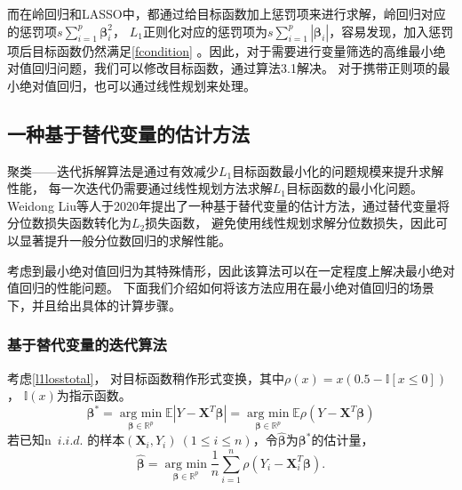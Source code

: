 而在岭回归和LASSO中，都通过给目标函数加上惩罚项来进行求解，岭回归对应的惩罚项$s\sum_{i=1}^p\bm{\beta}_i^2$，
$L_1$正则化对应的惩罚项为$s\sum_{i=1}^p|\bm{\beta}_i|$，容易发现，加入惩罚项后目标函数仍然满足\eqref{fcondition}
。因此，对于需要进行变量筛选的高维最小绝对值回归问题，我们可以修改目标函数，通过算法3.1解决。
对于携带正则项的最小绝对值回归，也可以通过线性规划来处理\cite{wang2006regularized}。

\subsection{一种基于替代变量的估计方法}
聚类——迭代拆解算法是通过有效减少$L_1$目标函数最小化的问题规模来提升求解性能，
每一次迭代仍需要通过线性规划方法求解$L_1$目标函数的最小化问题。
Weidong Liu等人于2020年提出了一种基于替代变量的估计方法\cite{svn}，通过替代变量将分位数损失函数转化为$L_2$损失函数，
避免使用线性规划求解分位数损失，因此可以显著提升一般分位数回归的求解性能。

考虑到最小绝对值回归为其特殊情形，因此该算法可以在一定程度上解决最小绝对值回归的性能问题。
下面我们介绍如何将该方法应用在最小绝对值回归的场景下，并且给出具体的计算步骤。

\subsubsection{基于替代变量的迭代算法}
考虑\eqref{l1losstotal}，
对目标函数稍作形式变换，其中$\rho(x) = x(0.5 - \mathbb{I}[x \leq 0])$，
$\mathbb{I}(x)$为指示函数。
\begin{equation}
\bm{\beta}^* = \underset{\bm{\beta} \in \mathbb{R}^{p}}{\operatorname{arg\ min}}\mathbb{E}|Y - \bm{X}^T\bm{\beta}| = 
\underset{\bm{\beta} \in \mathbb{R}^{p}}{\operatorname{arg\ min}}\mathbb{E}\rho(Y - \bm{X}^T\bm{\beta})
\end{equation}
若已知n\ $i.i.d.$ 的样本$(\bm{X}_i, Y_i)\ (1 \leq i \leq n)$，令$\hat{\bm{\beta}}$为$\bm{\beta}^*$的估计量，
\begin{equation}\label{rho-problem}
    \hat{\bm{\beta}} = \underset{\bm{\beta} \in \mathbb{R}^{p}}{\operatorname{arg\ min}}\frac1{n}\sum_{i=1}^{n}\rho(Y_i - \bm{X}_i^T\bm{\beta}).
\end{equation}

